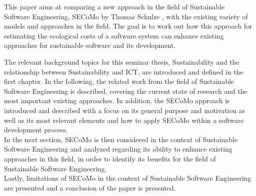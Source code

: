 This paper aims at comparing a new approach in the field of Sustainable Software Engineering, SECoMo by Thomas Schulze \cite{schulze_cost_2016}, with the existing variety of models and approaches in the field. The goal is to work out how this approach for estimating the ecological costs of a software system can enhance existing approaches for sustainable software and its development. %

The relevant background topics for this seminar thesis, Sustainability and the relationship between Sustainability and ICT,
are introduced and defined in the first chapter. In the following, the related work from the field of Sustainable Software Engineering is described, covering the current state of research and the most important existing approaches. %
 In addition, the SECoMo approach is introduced %
and described with a focus on its general purpose and motivation as well as its most relevant elements and how to apply SECoMo within a software development process. %
\\ In the next section, SECoMo is then considered in the context of Sustainable Software Engineering and analyzed regarding its ability to enhance existing approaches in this field, in order to identify its benefits for the field of Sustainable Software Engineering.\\
Lastly, limitations of SECoMo in the context of Sustainable Software Engineering are presented and a conclusion of the paper is presented.


